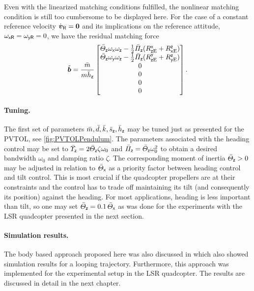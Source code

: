 Even with the linearized matching conditions fulfilled, the nonlinear matching condition is still too cumbersome to be displayed here.
For the case of a constant reference velocity $\dot{\boldsymbol{v}}_{\mathsf{R}} = \boldsymbol{0}$ and its implications on the reference attitude, $\omega_{\mathsf{x}\mathsf{R}}=\omega_{\mathsf{y}\mathsf{R}}=0$, we have the residual matching force
\begin{align} 
 \tilde{\boldsymbol{b}} = \frac{\bar{m}}{m\bar{h}_{\mathsf{z}}}\begin{bmatrix} \bar{\varTheta}_{\mathsf{z}}\omega_{\mathsf{x}}\omega_{\mathsf{z}} - \tfrac{1}{2}\bar{\varPi}_{\mathsf{z}}(R^{\mathsf{x}}_{\mathsf{z}\mathrm{E}}+R^{\mathsf{z}}_{\mathsf{x}\mathrm{E}}) \\ \bar{\varTheta}_{\mathsf{z}}\omega_{\mathsf{y}}\omega_{\mathsf{z}} - \tfrac{1}{2}\bar{\varPi}_{\mathsf{z}}(R^{\mathsf{y}}_{\mathsf{z}\mathrm{E}}+R^{\mathsf{z}}_{\mathsf{y}\mathrm{E}}) \\ 0 \\ 0 \\ 0 \\ 0 \end{bmatrix}
 .
\end{align}

\paragraph{Tuning.}
The first set of parameters $\bar{m}, \bar{d}, \bar{k}, \bar{s}_{\mathsf{z}}, \bar{h}_{\mathsf{z}}$ may be tuned just as presented for the PVTOL, see \autoref{fig:PVTOLPendulum}.
The parameters associated with the heading control may be set to $\bar{\varUpsilon}_{\mathsf{z}}=2\bar{\varTheta}_{\mathsf{z}}\zeta\omega_0$ and $\bar{\varPi}_{\mathsf{z}}=\bar{\varTheta}_{\mathsf{z}}\omega_0^2$ to obtain a desired bandwidth $\omega_0$ and damping ratio $\zeta$.
The corresponding moment of inertia $\bar{\varTheta}_{\mathsf{z}} > 0$ may be adjusted in relation to $\bar{\varTheta}_{\mathsf{x}}$ as a priority factor between heading control and tilt control.
This is most crucial if the quadcopter propellers are at their constraints and the control has to trade off maintaining its tilt (and consequently its position) against the heading.
For most applications, heading is less important than tilt, so one may set $\bar{\varTheta}_{\mathsf{z}} = 0.1\,\bar{\varTheta}_{\mathsf{x}}$ as was done for the experiments with the LSR quadcopter presented in the next section.


\paragraph{Simulation results.}
The body based approach proposed here was also discussed in \cite{Konz:GaussTrackingControl} which also showed simulation results for a looping trajectory.
Furthermore, this approach was implemented for the experimental setup in the LSR quadcopter.
The results are discussed in detail in the next chapter.
